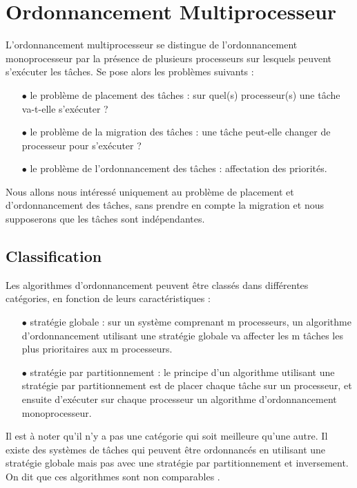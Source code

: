\section{Ordonnancement Multiprocesseur}
\vspace{-1cm}
L'ordonnancement multiprocesseur se distingue de l'ordonnancement monoprocesseur par la présence de plusieurs processeurs sur lesquels peuvent s'exécuter les tâches. Se pose alors les problèmes suivants :
\begin{itemize}
\item[$\bullet$] le problème de placement des tâches : sur quel(s) processeur(s) une tâche va-t-elle s'exécuter ?
\item[$\bullet$] le problème de la migration des tâches : une tâche peut-elle changer de processeur pour s'exécuter ?
\item[$\bullet$] le problème de l'ordonnancement des tâches : affectation des priorités.
\end{itemize}

Nous allons nous intéressé uniquement au problème de placement et d'ordonnancement des tâches, sans prendre en compte la migration et nous supposerons que les tâches sont indépendantes.

\subsection{Classification}
\vspace{-1cm}
Les algorithmes d'ordonnancement peuvent être classés dans différentes catégories, en fonction de leurs caractéristiques :
\begin{itemize}
\item[$\bullet$] stratégie globale : sur un système comprenant m processeurs, un algorithme d'ordonnancement utilisant une stratégie globale va affecter les m tâches les plus prioritaires aux m processeurs.
\item[$\bullet$] stratégie par partitionnement : le principe d'un algorithme utilisant une stratégie par partitionnement est de placer chaque tâche sur un processeur, et ensuite d'exécuter sur chaque processeur un algorithme d'ordonnancement monoprocesseur.
\end{itemize}
\indent Il est à noter qu'il n'y a pas une catégorie qui soit meilleure qu'une autre. Il existe des systèmes de tâches qui peuvent être ordonnancés en utilisant une stratégie globale mais pas avec une stratégie par partitionnement et inversement. On dit que ces algorithmes sont non comparables \cite{LW82}.

